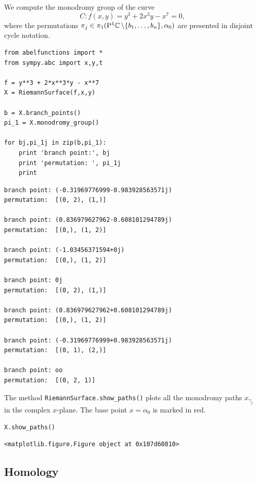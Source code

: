 We compute the monodromy group of the curve
\[
  C : f(x,y) = y^3 + 2x^3y - x^7 = 0,
\]
where the permutations $\pi_j \in \pi_1(\mathrm{P}^1 \!\operatorname{\mathbb{C}} \backslash \{b_1, \ldots,
b_n\}, \alpha_0)$ are presented in disjoint cycle notation.
\begin{lstlisting}
from abelfunctions import *
from sympy.abc import x,y,t

f = y**3 + 2*x**3*y - x**7
X = RiemannSurface(f,x,y)

b = X.branch_points()
pi_1 = X.monodromy_group()

for bj,pi_1j in zip(b,pi_1):
    print 'branch point:', bj
    print 'permutation: ', pi_1j
    print
\end{lstlisting}
\begin{lstlisting}
branch point: (-0.31969776999-0.983928563571j)
permutation:  [(0, 2), (1,)]

branch point: (0.836979627962-0.608101294789j)
permutation:  [(0,), (1, 2)]

branch point: (-1.03456371594+0j)
permutation:  [(0,), (1, 2)]

branch point: 0j
permutation:  [(0, 2), (1,)]

branch point: (0.836979627962+0.608101294789j)
permutation:  [(0,), (1, 2)]

branch point: (-0.31969776999+0.983928563571j)
permutation:  [(0, 1), (2,)]

branch point: oo
permutation:  [(0, 2, 1)]
\end{lstlisting}
The method \verb=RiemannSurface.show_paths()= plots all the monodromy paths
$x_{\gamma_j}$ in the complex $x$-plane. The base point $x=\alpha_0$ is marked
in red.
\begin{lstlisting}[firstnumber=14]
X.show_paths()
\end{lstlisting}
\begin{lstlisting}
<matplotlib.figure.Figure object at 0x107d60810>
\end{lstlisting}
\begin{center}
\end{center}


\subsection{Homology}\label{subsec:background-homology}

